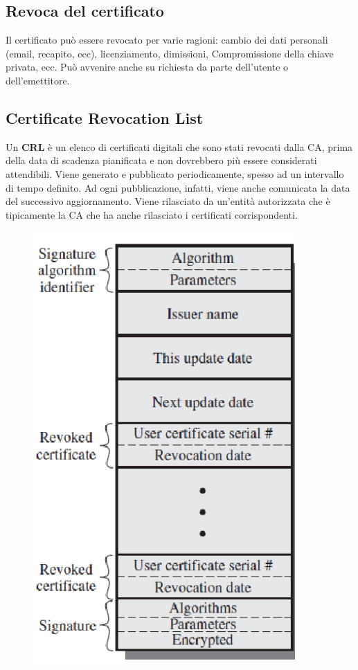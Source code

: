 \subsection{Revoca del certificato}

Il certificato può essere revocato per varie ragioni: cambio dei dati
personali (email, recapito, ecc),
licenziamento, dimissioni, Compromissione della chiave privata, ecc.
Può avvenire anche su richiesta da parte dell’utente o dell’emettitore.

\subsection{Certificate Revocation List}

Un \textbf{CRL} è un elenco di certificati digitali che sono stati revocati
dalla CA,
prima della data di scadenza pianificata e non dovrebbero più essere
considerati attendibili.
Viene generato e pubblicato periodicamente, spesso ad un intervallo di
tempo definito. Ad ogni
pubblicazione, infatti, viene anche comunicata la data del successivo
aggiornamento.
Viene rilasciato da un'entità autorizzata che è tipicamente la CA
che ha anche rilasciato i certificati
corrispondenti.

\begin{figure}[H]
    \centering
    \includegraphics[width=10cm, keepaspectratio]{capitoli/crittografia/imgs/CRL.png}
\end{figure}

